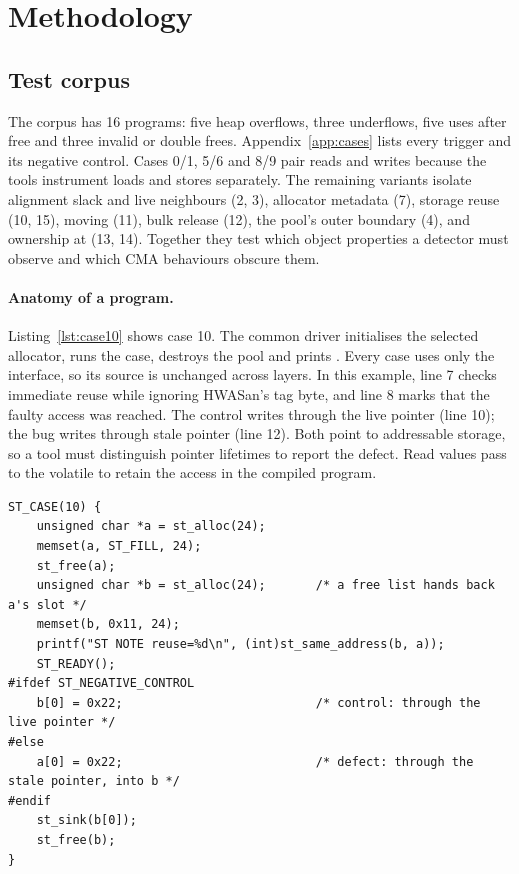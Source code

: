 \section{Methodology}
\label{sec:method}

\subsection{Test corpus}
\label{sec:corpus}

The corpus has 16 programs: five heap overflows, three underflows, five uses after free and three invalid or double frees. Appendix~\ref{app:cases} lists every trigger and its negative control. Cases 0/1, 5/6 and 8/9 pair reads and writes because the tools instrument loads and stores separately. The remaining variants isolate alignment slack and live neighbours (2, 3), allocator metadata (7), storage reuse (10, 15), moving  (11), bulk release (12), the pool's outer boundary (4), and ownership at  (13, 14). Together they test which object properties a detector must observe and which CMA behaviours obscure them.

\paragraph{Anatomy of a program.} Listing~\ref{lst:case10} shows case 10. The common driver initialises the selected allocator, runs the case, destroys the pool and prints . Every case uses only the  interface, so its source is unchanged across layers. In this example, line 7 checks immediate reuse while ignoring HWASan's tag byte, and line 8 marks that the faulty access was reached. The control writes through the live pointer  (line 10); the bug writes through stale pointer  (line 12). Both point to addressable storage, so a tool must distinguish pointer lifetimes to report the defect. Read values pass to the volatile  to retain the access in the compiled program.

\begin{lstlisting}[float=htbp, caption={Case 10, use after free into reissued storage
(\code{corpus/cases/case10-use-after-free-reuse-write/case.c}, header comment omitted).},
label=lst:case10]
ST_CASE(10) {
    unsigned char *a = st_alloc(24);
    memset(a, ST_FILL, 24);
    st_free(a);
    unsigned char *b = st_alloc(24);       /* a free list hands back a's slot */
    memset(b, 0x11, 24);
    printf("ST NOTE reuse=%d\n", (int)st_same_address(b, a));
    ST_READY();
#ifdef ST_NEGATIVE_CONTROL
    b[0] = 0x22;                           /* control: through the live pointer */
#else
    a[0] = 0x22;                           /* defect: through the stale pointer, into b */
#endif
    st_sink(b[0]);
    st_free(b);
}
\end{lstlisting}

